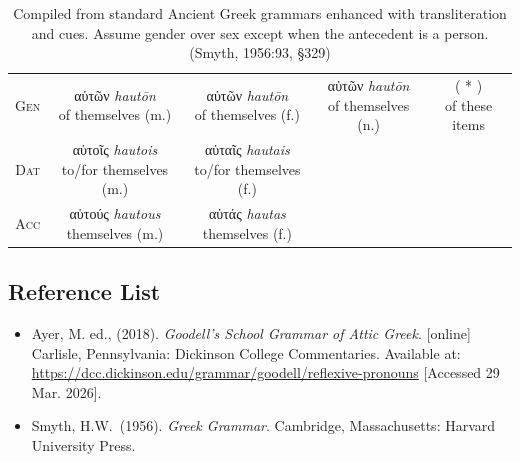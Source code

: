 \documentclass[10pt,a4paper,notitlepage]{article}
\newcommand{\tsc}[1]{\textsc{#1}}
\newcommand*{\grc}[1]{\fontspec{Inter}#1\rmfamily}
\newcommand{\trc}[1]{\textit{\fontspec{Tinos}#1}}
\begin{document}
\begin{table}[H]
\begin{tabular}{c|ccc|c}
            \tsc{Gen} & \makecell{\grc{αὑτῶν} \trc{hautōn} \\ \small of themselves (m.)}
                    & \makecell{\grc{αὑτῶν} \trc{hautōn} \\ \small of themselves (f.)}
                    & \makecell{\grc{αὑτῶν} \trc{hautōn} \\ \small of themselves (n.)}
                    & \makecell{( * ) \\ \small of these items} \\
            \tsc{Dat} & \makecell{\grc{αὑτοῖς} \trc{hautois} \\ \small to/for themselves (m.)}
                    & \makecell{\grc{αὑταῖς} \trc{hautais} \\ \small to/for themselves (f.)}
                    & \makecell{--}
                    & \makecell{--} \\
            \tsc{Acc} & \makecell{\grc{αὑτούς} \trc{hautous} \\ \small themselves (m.)}
                    & \makecell{\grc{αὑτάς} \trc{hautas} \\ \small themselves (f.)}
                    & \makecell{--}
                    & \makecell{--} \\
        \end{tabular}
         \caption{Compiled from standard Ancient Greek grammars enhanced with transliteration and cues.
            Assume gender over sex except when the antecedent is a person.
             (Smyth, 1956:93, \S329)}
     \end{table}

    \subsection*{Reference List}
    \begin{itemize}[label={}, leftmargin=0]
        \item Ayer, M. ed., (2018). \textit{Goodell’s School Grammar of Attic Greek}. [online] Carlisle, Pennsylvania: Dickinson College Commentaries. Available at: \url{https://dcc.dickinson.edu/grammar/goodell/reflexive-pronouns} [Accessed 29 Mar. 2026].
        \item Smyth, H.W.\ (1956). \textit{Greek Grammar}. Cambridge, Massachusetts: Harvard University Press.
    \end{itemize}
\end{document}
